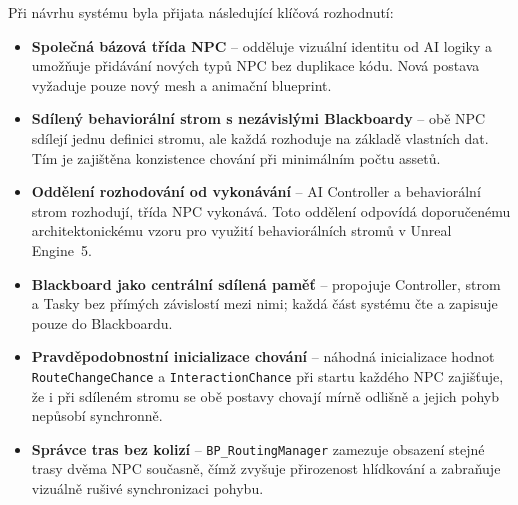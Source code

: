Při návrhu systému byla přijata následující klíčová rozhodnutí:

\begin{itemize}
    \item \textbf{Společná bázová třída NPC} -- odděluje vizuální identitu od AI logiky a umožňuje přidávání nových typů NPC bez duplikace kódu. 
    Nová postava vyžaduje pouze nový mesh a animační blueprint.

    \item \textbf{Sdílený behaviorální strom s nezávislými Blackboardy} -- obě NPC sdílejí jednu definici stromu, ale každá rozhoduje na základě vlastních dat. 
    Tím je zajištěna konzistence chování při minimálním počtu assetů.

    \item \textbf{Oddělení rozhodování od vykonávání} -- AI Controller a behaviorální strom rozhodují, třída NPC vykonává. 
    Toto oddělení odpovídá doporučenému architektonickému vzoru pro využití behaviorálních stromů v Unreal Engine~5.

    \item \textbf{Blackboard jako centrální sdílená paměť} -- propojuje Controller, strom a Tasky bez přímých závislostí mezi nimi; každá část systému čte a zapisuje pouze do Blackboardu.

    \item \textbf{Pravděpodobnostní inicializace chování} -- náhodná inicializace hodnot \texttt{RouteChangeChance} a \texttt{InteractionChance} při startu 
    každého NPC zajišťuje, že i při sdíleném stromu se obě postavy chovají mírně odlišně a jejich pohyb nepůsobí synchronně.

    \item \textbf{Správce tras bez kolizí} -- \texttt{BP\_RoutingManager} zamezuje obsazení stejné trasy dvěma NPC současně, čímž zvyšuje přirozenost hlídkování 
    a zabraňuje vizuálně rušivé synchronizaci pohybu.
\end{itemize}

